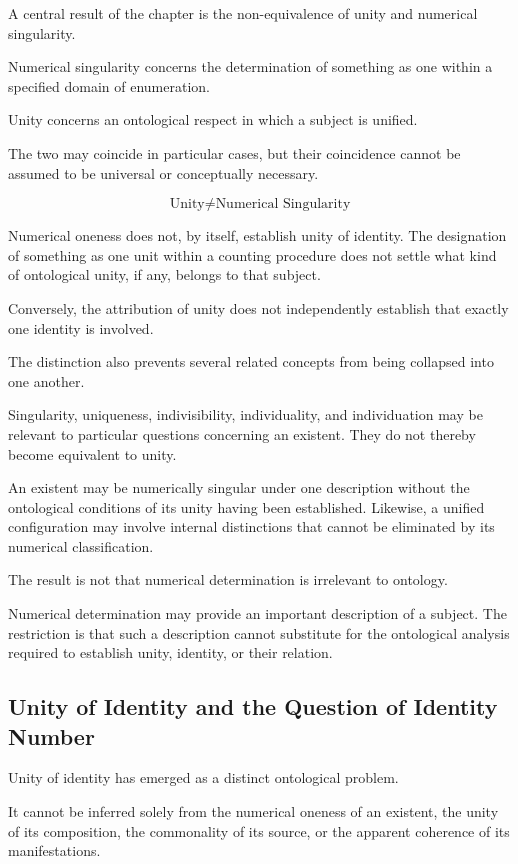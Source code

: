 A central result of the chapter
is the non-equivalence of unity
and numerical singularity.

Numerical singularity concerns
the determination of something
as one within a specified domain
of enumeration.

Unity concerns an ontological
respect in which a subject is
unified.

The two may coincide in particular
cases, but their coincidence cannot
be assumed to be universal or
conceptually necessary.

\[
\text{Unity}
\neq
\text{Numerical Singularity}
\]

Numerical oneness does not, by
itself, establish unity of identity.
The designation of something as
one unit within a counting procedure
does not settle what kind of
ontological unity, if any, belongs
to that subject.

Conversely, the attribution of
unity does not independently
establish that exactly one identity
is involved.

The distinction also prevents
several related concepts from
being collapsed into one another.

Singularity, uniqueness, indivisibility,
individuality, and individuation
may be relevant to particular
questions concerning an existent.
They do not thereby become
equivalent to unity.

An existent may be numerically
singular under one description
without the ontological conditions
of its unity having been established.
Likewise, a unified configuration
may involve internal distinctions
that cannot be eliminated by
its numerical classification.

The result is not that numerical
determination is irrelevant to
ontology.

Numerical determination may provide
an important description of a subject.
The restriction is that such a
description cannot substitute for
the ontological analysis required
to establish unity, identity, or
their relation.

\subsection{Unity of Identity and the Question of Identity Number}

Unity of identity has emerged
as a distinct ontological problem.

It cannot be inferred solely
from the numerical oneness of
an existent, the unity of its
composition, the commonality of
its source, or the apparent coherence
of its manifestations.

